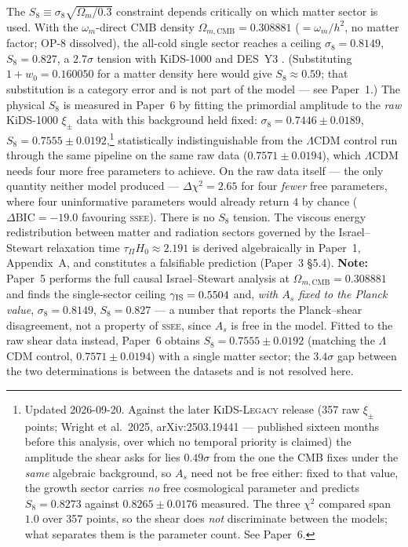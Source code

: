 \documentclass[12pt,a4paper]{article}
\newcommand{\SSEE}{\ifmmode\mathrm{SSEE}\else\textsc{ssee}\fi}
\begin{document}
The $S_8 \equiv \sigma_8\sqrt{\Omega_m/0.3}$ constraint depends critically on
which matter sector is used.  With the $\omega_m$-direct CMB density
$\Omega_{m,\mathrm{CMB}}=0.308881$ ($=\omega_m/h^2$, no matter factor; OP-8
dissolved), the all-cold single sector reaches a ceiling
$\sigma_8=0.8149$, $S_8=0.827$, a $2.7\sigma$ tension with KiDS-1000
\citep{Heymans2021} and DES~Y3 \citep{Abbott2022}.
(Substituting $1+w_0=0.160050$ for a matter density here would give
$S_8\approx0.59$; that substitution is a category error and is not part of the
model --- see Paper~1.) The physical $S_8$ is measured in Paper~6 by fitting the
primordial amplitude to the \emph{raw} KiDS-1000 $\xi_\pm$ data with this
background held fixed: $\sigma_8=0.7446\pm0.0189$, $S_8=0.7555\pm0.0192$,\footnote{Updated 2026-09-20. Against the later \textsc{KiDS-Legacy} release (357 raw $\xi_\pm$ points; Wright et al.\ 2025, arXiv:2503.19441 --- published sixteen months before this analysis, over which no temporal priority is claimed) the amplitude the shear asks for lies $0.49\sigma$ from the one the CMB fixes under the \emph{same} algebraic background, so $A_s$ need not be free either: fixed to that value, the growth sector carries \emph{no} free cosmological parameter and predicts $S_8=0.8273$ against $0.8265\pm0.0176$ measured. The three $\chi^2$ compared span $1.0$ over 357 points, so the shear does \emph{not} discriminate between the models; what separates them is the parameter count. See Paper~6.}
statistically indistinguishable from the $\Lambda$CDM control run through the same pipeline on the same raw data ($0.7571\pm0.0194$), which $\Lambda$CDM needs four more free parameters to achieve. On the raw data itself --- the only quantity neither model produced --- $\Delta\chi^2=2.65$ for four \emph{fewer} free parameters, where four uninformative parameters would already return $4$ by chance ($\Delta\mathrm{BIC}=-19.0$ favouring \SSEE{}). There is no $S_8$ tension.
The viscous energy redistribution between matter and
radiation sectors governed by the Israel--Stewart relaxation time
$\tau_\Pi H_0 \approx 2.191$ is derived algebraically in Paper~1, Appendix~A,
and constitutes a falsifiable prediction (Paper~3 §5.4).
\textbf{Note:} Paper~5 performs the full causal Israel--Stewart analysis at
$\Omega_{m,\mathrm{CMB}}=0.308881$ and finds the single-sector ceiling
$\gamma_{\rm IS}=0.5504$ and, \emph{with $A_s$ fixed to the Planck value},
$\sigma_8=0.8149$, $S_8=0.827$ --- a number that reports the Planck--shear
disagreement, not a property of \SSEE{}, since $A_s$ is free in the model.
Fitted to the raw shear data instead, Paper~6 obtains $S_8=0.7555\pm0.0192$
(matching the $\Lambda$CDM control, $0.7571\pm0.0194$) with a single matter sector; the $3.4\sigma$ gap between
the two determinations is between the datasets and is not resolved here.
\end{document}
